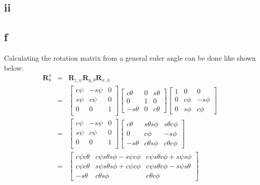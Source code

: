 \documentclass[11pt]{article}
\begin{document}
\subsection*{ii}

\subsection*{f}
Calculating the rotation matrix from a general euler angle can be done like shown below:
\begin{eqnarray*}
\mathbf{R}_b^a &=& \mathbf{R}_{z,\psi} \mathbf{R}_{y,\theta} \mathbf{R}_{x,\phi} \\
&=&
\begin{bmatrix}
c\psi & -s\psi & 0 \\
s\psi & c\psi & 0 \\
0 & 0 & 1 \\
\end{bmatrix}
\begin{bmatrix}
c\theta & 0 & s\theta \\
0 & 1 & 0 \\
-s\theta & 0 & c\theta
\end{bmatrix}
\begin{bmatrix}
1 & 0 & 0 \\
0 & c\phi & -s\phi \\
0 & s\phi & c\phi
\end{bmatrix} \\
&=& 
\begin{bmatrix}
c\psi & -s\psi & 0 \\
s\psi & c\psi & 0 \\
0 & 0 & 1 \\
\end{bmatrix}
\begin{bmatrix}
c\theta & s\theta s\phi & s\theta c\phi \\
0 & c\phi & - s\phi  \\
- s\theta & c\theta s\phi & c\theta c\phi
\end{bmatrix} \\
&=& \begin{bmatrix}
c\psi c\theta  & c\psi s\theta s\phi - s\psi c\phi & c\psi s\theta c\phi + s\psi s\phi \\
c\psi c\theta & s\psi s\theta s\phi + c\psi c\phi &   c\psi s\theta c\phi - s\psi s\theta \\
- s\theta & c\theta s\phi & c\theta c\phi
\end{bmatrix}
\end{eqnarray*}
\end{document}
